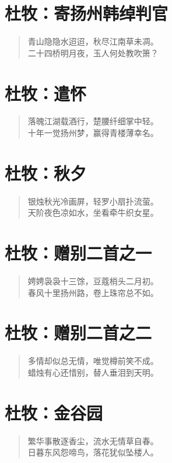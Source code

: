 \documentclass[12pt,oneside]{book}
\newenvironment{shici}{%
\begin{verse}\centering\yanti\large\hspace{12pt}}{\end{verse}}
\begin{document}
\begin{common-format}
\chapter{杜牧：寄扬州韩绰判官}
\begin{shici}
青山隐隐水迢迢，秋尽江南草未凋。\\
二十四桥明月夜，玉人何处教吹箫？
\end{shici}

\chapter{杜牧：遣怀}
\begin{shici}
落魄江湖载酒行，楚腰纤细掌中轻。\\
十年一觉扬州梦，赢得青楼薄幸名。
\end{shici}

\chapter{杜牧：秋夕}
\begin{shici}
银烛秋光冷画屏，轻罗小扇扑流萤。\\
天阶夜色凉如水，坐看牵牛织女星。
\end{shici}

\chapter{杜牧：赠别二首之一}
\begin{shici}
娉娉袅袅十三馀，豆蔻梢头二月初。\\
春风十里扬州路，卷上珠帘总不如。
\end{shici}

\chapter{杜牧：赠别二首之二}
\begin{shici}
多情却似总无情，唯觉樽前笑不成。\\
蜡烛有心还惜别，替人垂泪到天明。
\end{shici}

\chapter{杜牧：金谷园}
\begin{shici}
繁华事散逐香尘，流水无情草自春。\\
日暮东风怨啼鸟，落花犹似坠楼人。
\end{shici}


\end{common-format}
\end{document}
